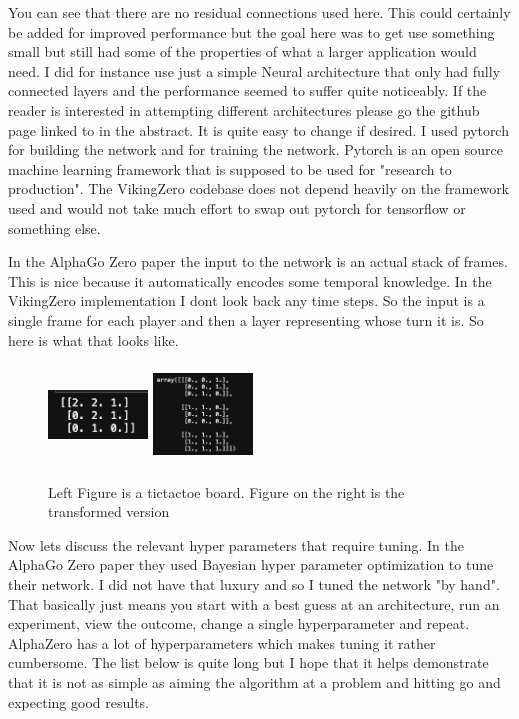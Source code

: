 You can see that there are no residual connections used here. This could certainly be added for improved performance but the goal here was to get use something small but still had some of the properties of what a larger application would need.  I did for instance use just a simple Neural architecture that only had fully connected layers and the performance seemed to suffer quite noticeably. If the reader is interested in attempting different architectures please go the github page linked to in the abstract. It is quite easy to change if desired. I used pytorch for building the network and for training the network. Pytorch \cite{pytorch} is an open source machine learning framework that is supposed to be used for "research to production". The VikingZero codebase does not depend heavily on the framework used and would not take much effort to swap out pytorch for tensorflow or something else. 

In the AlphaGo Zero paper the input to the network is an actual stack of frames. This is nice because it automatically encodes some temporal knowledge. In the VikingZero implementation I dont look back any time steps. So the input is a single frame for each player and then a layer representing whose turn it is. So here is what that looks like. 

\begin{figure}[H]
       \centering
       \includegraphics[width=100px,height=100px]{experiments/demo_board_1.png}
       \includegraphics[width=100px,height=100px]{experiments/transform_demo_board.png}
       \caption{Left Figure is a tictactoe board. Figure on the right is the transformed version }
       \label{fig:my_label}
\end{figure}

Now lets discuss the relevant hyper parameters that require tuning. In the AlphaGo Zero paper they used Bayesian hyper parameter optimization to tune their network. I did not have that luxury and so I tuned the network "by hand". That basically just means you start with a best guess at an architecture, run an experiment, view the outcome, change a single hyperparameter and repeat. AlphaZero has a lot of hyperparameters which makes tuning it rather cumbersome. The list below is quite long but I hope that it helps demonstrate that it is not as simple as aiming the algorithm at a problem and hitting go and expecting good results. 

